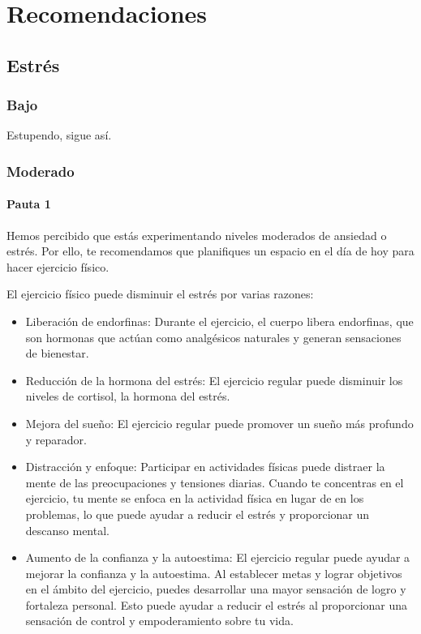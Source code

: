 \chapter{Recomendaciones}
\label{chapter:recomendaciones}

    \section{Estrés}
        \label{chapter:recomendaciones:estres}
        \subsection{Bajo}
            Estupendo, sigue así. 
        \subsection{Moderado}
            \subsubsection{Pauta 1}
                Hemos percibido que estás experimentando niveles moderados de ansiedad o estrés. 
                Por ello, te recomendamos que planifiques un espacio en el día de hoy para hacer ejercicio físico.

                El ejercicio físico puede disminuir el estrés por varias razones:
                \begin{itemize}
                    \item Liberación de endorfinas: Durante el ejercicio, el cuerpo libera endorfinas, que son hormonas que  actúan como analgésicos naturales y generan sensaciones de bienestar. 
                    \item Reducción de la hormona del estrés: El ejercicio regular puede disminuir los niveles de cortisol, la hormona del estrés.
                    \item Mejora del sueño: El ejercicio regular puede promover un sueño más profundo y reparador.
                    \item Distracción y enfoque: Participar en actividades físicas puede distraer la mente de las preocupaciones y tensiones diarias. Cuando te concentras en el ejercicio, tu mente se enfoca en la actividad física en lugar de en los problemas, lo que puede ayudar a reducir el estrés y proporcionar un descanso mental.
                    \item Aumento de la confianza y la autoestima: El ejercicio regular puede ayudar a mejorar la confianza y la autoestima. Al establecer metas y lograr objetivos en el ámbito del ejercicio, puedes desarrollar una mayor sensación de logro y fortaleza personal. Esto puede ayudar a reducir el estrés al 
                    proporcionar una sensación de control y empoderamiento sobre tu vida.
                \end{itemize}

